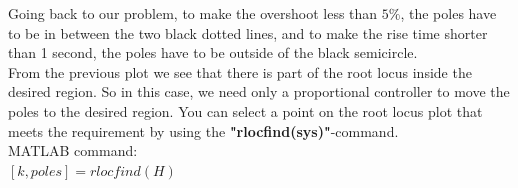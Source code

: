 \begin{frame}
	\begin{exampleblock}{}
		\justify
		Going back to our problem, to make the overshoot less than $5\%$, the poles have to be in between the two black dotted lines, and to make the rise time shorter than 1 second, the poles have to be outside of the black semicircle.\\
		\vspace{1em}
		From the previous plot we see that there is part of the root locus inside the desired region. So in this case, we need only a proportional controller to move the poles to the desired region. You can select a point on the root locus plot that meets the requirement by using the \textbf{"rlocfind(sys)"}-command.\\
		\vspace{1em}
		MATLAB command:\\
		$[k,poles] = rlocfind(H)$
	\end{exampleblock}
\end{frame}

